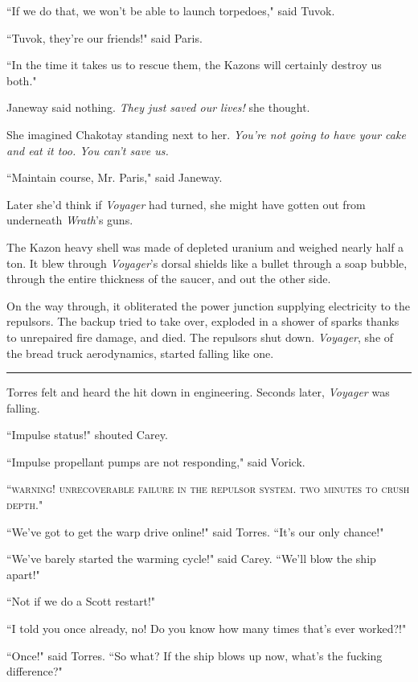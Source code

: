 \documentclass[twoside,letterpaper,12pt]{memoir}
\begin{document}
``If we do that, we won't be able to launch torpedoes," said Tuvok.

``Tuvok, they're our friends!" said Paris.

``In the time it takes us to rescue them, the Kazons will certainly destroy us both."

Janeway said nothing. \textit{They just saved our lives!} she thought.

She imagined Chakotay standing next to her. \textit{You're not going to have your cake and eat it too. You can't save us.}

``Maintain course, Mr. Paris," said Janeway.

Later she'd think if \textit{Voyager} had turned, she might have gotten out from underneath \textit{Wrath}'s guns.

The Kazon heavy shell was made of depleted uranium and weighed nearly half a ton. It blew through \textit{Voyager}'s dorsal shields like a bullet through a soap bubble, through the entire thickness of the saucer, and out the other side.

On the way through, it obliterated the power junction supplying electricity to the repulsors. The backup tried to take over, exploded in a shower of sparks thanks to unrepaired fire damage, and died. The repulsors shut down. \textit{Voyager}, she of the bread truck aerodynamics, started falling like one.

\begin{center}\rule{3cm}{0.4 pt}\end{center}

Torres felt and heard the hit down in engineering. Seconds later, \textit{Voyager} was falling.

``Impulse status!" shouted Carey.

``Impulse propellant pumps are not responding," said Vorick.

``\textsc{warning! unrecoverable failure in the repulsor system. two minutes to crush depth.}"

``We've got to get the warp drive online!" said Torres. ``It's our only chance!"

``We've barely started the warming cycle!" said Carey. ``We'll blow the ship apart!"

``Not if we do a Scott restart!"

``I told you once already, no! Do you know how many times that's ever worked?!"

``Once!" said Torres. ``So what? If the ship blows up now, what's the fucking difference?"
\end{document}
